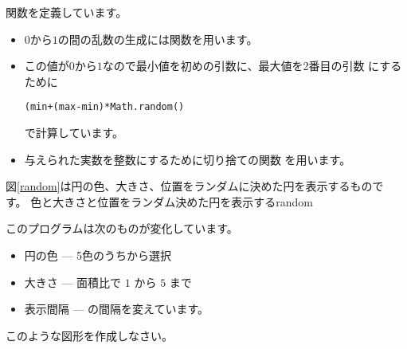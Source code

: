\begin{itemize}
       関数を定義しています。
\begin{itemize}
 \item $0$から$1$の間の乱数の生成には関数を用います。
 \item この値が$0$から$1$なので最小値を初めの引数に、最大値を2番目の引数
       にするために
\begin{center}
 \texttt{(min+(max-min)*Math.random()}
\end{center}
で計算しています。
 \item 与えられた実数を整数にするために切り捨ての関数
       を用います。
\end{itemize}
\end{itemize}
\iffalse\else
\begin{Problem}\upshape\label{prob-random}
図\ref{random}は円の色、大きさ、位置をランダムに決めた円を表示するもので
 す。
{色と大きさと位置をランダム決めた円を表示する}{random}

このプログラムは次のものが変化しています。
\begin{itemize}\upshape
 \item 円の色 --- 5色のうちから選択
 \item 大きさ --- 面積比で $1$ から $5$ まで
 \item 表示間隔 --- の間隔を変えています。
\end{itemize}
このような図形を作成しなさい。
\end{Problem}
\fi